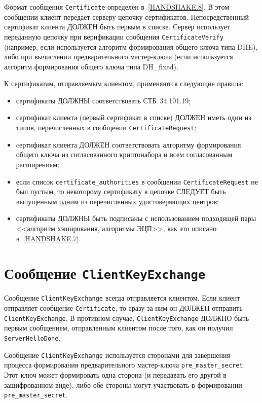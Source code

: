 Формат сообщения \lstinline{Certificate} определен в~\ref{HANDSHAKE.8}. В
этом сообщении клиент передает серверу цепочку сертификатов.
Непосредственный сертификат клиента ДОЛЖЕН быть первым в списке. Сервер
использует переданную цепочку при верификации сообщения
\lstinline{CertificateVerify} (например, если используется алгоритм
формирования общего ключа типа DHE), либо при вычислении
предварительного мастер-ключа (если используется алгоритм формирования
общего ключа типа DH\_fixed).

К сертификатам, отправляемым клиентом, применяются следующие правила:
\begin{itemize}
\item[--]
сертификаты ДОЛЖНЫ соответствовать СТБ~34.101.19;

\item[--]
сертификат клиента (первый сертификат в списке) ДОЛЖЕН иметь один 
из типов, перечисленных в сообщении \lstinline{CertificateRequest}; 

\item[--]
cертификат клиента ДОЛЖЕН соответствовать алгоритму формирования 
общего ключа из согласованного криптонабора и всем согласованным 
расширениям; 

\item[--] 
если список \lstinline{certificate_authorities} в сообщении 
\lstinline{CertificateRequest} не был пустым, то некоторому сертификату в 
цепочке СЛЕДУЕТ быть выпущенным одним из перечисленных удостоверяющих 
центров;  

\item[--] 
сертификаты ДОЛЖНЫ быть подписаны с использованием подходящей 
пары  <<алгоритм хэширования, алгоритмы ЭЦП>>, как это описано 
в~\ref{HANDSHAKE.7}. 
\end{itemize}

\section{Сообщение \lstinline{ClientKeyExchange}}\label{HANDSHAKE.13}

Сообщение \lstinline{ClientKeyExchange} всегда отправляется клиентом. Если
клиент отправляет сообщение \lstinline{Certificate}, то сразу за ним он
ДОЛЖЕН отправить \lstinline{ClientKeyExchange}. В противном случае,
\lstinline{ClientKeyExchange} ДОЛЖНО быть первым сообщением, отправленным
клиентом после того, как он получил \lstinline{ServerHelloDone}.

Сообщение \lstinline{ClientKeyExchange} используется сторонами для
завершения процесса формирования предварительного мастер-ключа
\lstinline{pre_master_secret}. Этот ключ может формировать одна сторона (и
передавать его другой в зашифрованном виде), либо обе стороны могут
участвовать в формировании \lstinline{pre_master_secret}.


